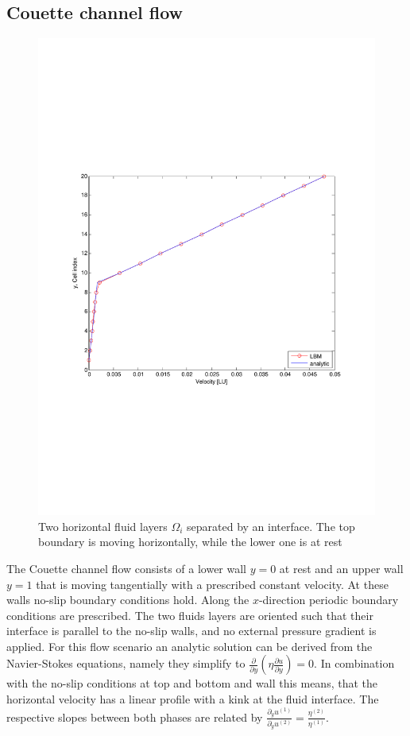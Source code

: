 \documentclass[final,leqno,onefignum,onetabnum]{siamltexmm}
\begin{document}
\subsection{Couette channel flow}
\begin{figure}[b!]
	\flushright
	\hfill\includegraphics[trim = 0mm 8cm 0mm 8cm, clip, width=.8\textwidth, natwidth=595,natheight=842]{couette1.pdf}\hspace*{\fill}
  \caption{Two horizontal fluid layers $\Omega_i$ separated by an interface. The top boundary is moving horizontally, while the lower one is at rest}
	\label{couette1}
\end{figure}
The Couette channel flow consists of a lower wall $y=0$ at rest and an upper wall $y=1$ that is moving tangentially with a prescribed constant velocity. At these walls no-slip boundary conditions hold. Along the $x$-direction periodic boundary conditions are prescribed. The two fluids layers are oriented such that their interface is parallel to the no-slip walls, and no external pressure gradient is applied.
For this flow scenario an analytic solution can be derived from the Navier-Stokes equations, namely they simplify to $\frac{\partial }{\partial y}\left( \eta\frac{\partial u}{\partial y}\right) =0$. In combination with the no-slip conditions at top and bottom and wall this means, that the horizontal velocity has a linear profile with a kink at the fluid interface. The respective slopes between both phases are related by $\frac{\partial_y u^{(1)}}{\partial_y u^{(2)}} = \frac{\eta^{(2)}}{\eta^{(1)}}$.
\end{document}
